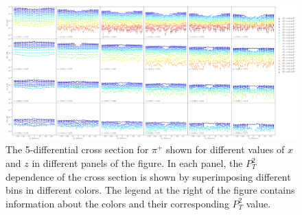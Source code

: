\begin{figure}
  \centering
  \includegraphics[width=\textwidth]{image/plots/sidis/pip_cross_section_x_z.pdf}
  \caption[$d^5\sigma$ for $\pi^+$]{The 5-differential cross section for $\pi^+$ shown for different values of $x$ and $z$ in different panels of the figure.  In each panel, the $P_T^2$ dependence of the cross section is shown by superimposing different bins in different colors.  The legend at the right of the figure contains information about the colors and their corresponding $P_T^2$ value.}
    \label{fig:cross-section-pip}

\end{figure}
